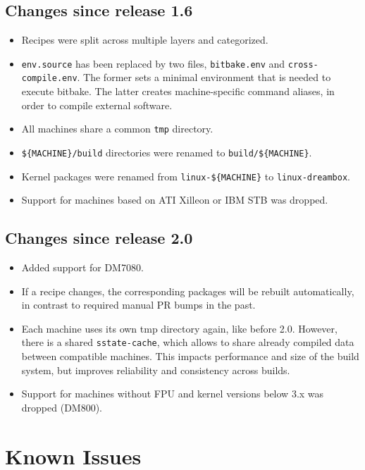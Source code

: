 \documentclass[a4paper]{article}
\newcommand{\shell}[1]{\texttt{\small #1}}
\begin{document}
  \subsection{Changes since release 1.6}
    \begin{itemize}
      \item Recipes were split across multiple layers and categorized.
      \item \shell{env.source} has been replaced by two files,
        \shell{bitbake.env} and \shell{cross-compile.env}. The former sets a minimal
        environment that is needed to execute bitbake. The latter creates
        machine-specific command aliases, in order to compile external software.
      \item All machines share a common \shell{tmp} directory.
      \item \shell{\$\{MACHINE\}/build} directories were renamed to \shell{build/\$\{MACHINE\}}.
      \item Kernel packages were renamed from \shell{linux-\$\{MACHINE\}} to \shell{linux-dreambox}.
      \item Support for machines based on ATI Xilleon or IBM STB was dropped.
    \end{itemize}

  \subsection{Changes since release 2.0}
    \begin{itemize}
      \item Added support for DM7080.
      \item If a recipe changes, the corresponding packages will be rebuilt automatically,
            in contrast to required manual PR bumps in the past.
      \item Each machine uses its own tmp directory again, like before 2.0. However,
            there is a shared \shell{sstate-cache}, which allows to share already compiled
            data between compatible machines. This impacts performance and size of the
            build system, but improves reliability and consistency across builds.
      \item Support for machines without FPU and kernel versions below 3.x was dropped (DM800).
    \end{itemize}

\section{Known Issues}
\end{document}
